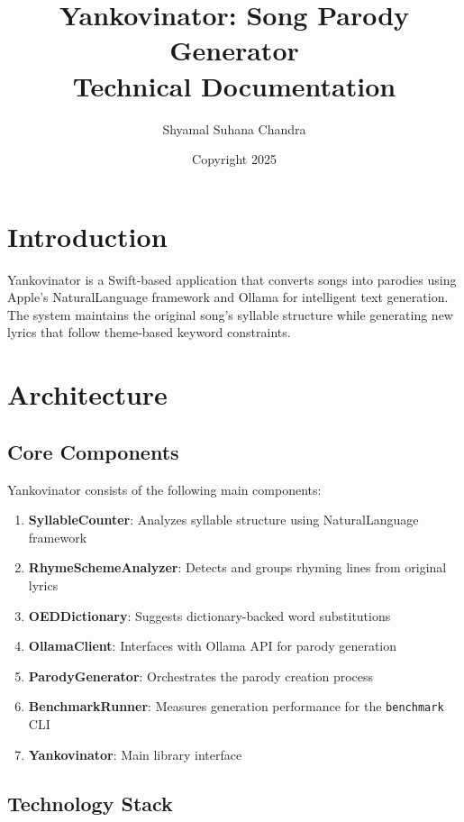 \documentclass[11pt,a4paper]{article}
\title{Yankovinator: Song Parody Generator\\
\large Technical Documentation}
\author{Shyamal Suhana Chandra}
\date{Copyright \textcopyright{} 2025}
\begin{document}
\maketitle

\tableofcontents
\newpage

\section{Introduction}

Yankovinator is a Swift-based application that converts songs into parodies using Apple's NaturalLanguage framework and Ollama for intelligent text generation. The system maintains the original song's syllable structure while generating new lyrics that follow theme-based keyword constraints.

\section{Architecture}

\subsection{Core Components}

Yankovinator consists of the following main components:

\begin{enumerate}
    \item \textbf{SyllableCounter}: Analyzes syllable structure using NaturalLanguage framework
    \item \textbf{RhymeSchemeAnalyzer}: Detects and groups rhyming lines from original lyrics
    \item \textbf{OEDDictionary}: Suggests dictionary-backed word substitutions
    \item \textbf{OllamaClient}: Interfaces with Ollama API for parody generation
    \item \textbf{ParodyGenerator}: Orchestrates the parody creation process
    \item \textbf{BenchmarkRunner}: Measures generation performance for the \texttt{benchmark} CLI
    \item \textbf{Yankovinator}: Main library interface
\end{enumerate}

\subsection{Technology Stack}
\end{document}
